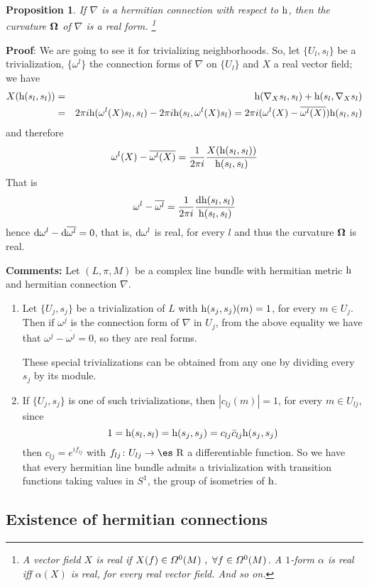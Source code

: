 \documentclass[12pt]{article}
\theoremstyle{plain}
\newtheorem{prop}{Proposition}
\def\beann{\begin{eqnarray*}}
\def\eeann{\end{eqnarray*}}
\def\qed{\ifvmode\removelastskip\fi
{\unskip\nobreak\hfil\penalty50\hbox{}\nobreak\hfil
\hbox{\vrule height1.2ex width1.2ex}\parfillskip=0pt
\finalhyphendemerits=0 \par\smallskip}}
\def\d{{\rm d}}
\def\h{{\rm h}}
\def\curv{{\bf \Omega}}
\def\Real{\mbox{\es R}}
\begin{document}
\begin{prop}
If $\nabla$ is a hermitian connection with respect to $\h$,
then the curvature $\curv $ of $\nabla$ is a real form.%
\footnote{A vector field $X$ is {\it real} if $X(f) \in {\mit\Omega}^0(M) \ ,
\ \forall f \in {\mit\Omega}^0(M)$. A $1$-form $\alpha$ is real iff
$\alpha (X)$ is real, for every real vector field. And so on.
}
\label{cureal}
\end{prop}
{\bf Proof}:  We are going to see it for trivializing
neighborhoods. So, let $\{ U_l,s_l \}$ be a trivialization, $\{
\omega^l  \}$ the connection forms of $\nabla$ on $\{ U_l \}$ and
$X$ a real vector field; we have \beann X(\h (s_l,s_l)) &=& \h
(\nabla_X s_l,s_l) + \h (s_l,\nabla_X s_l)
\\ &=&
2\pi i \h (\omega^l (X)s_l,s_l) - 2\pi i \h (s_l,\omega^l (X)s_l) =
2\pi i (\omega^l (X) - \overline{\omega^l (X)}) \h (s_l,s_l)
\eeann
and therefore
$$
\omega^l (X) - \overline{\omega^l (X)} =
\frac{1}{2\pi i} \frac{X(\h (s_l,s_l))}{\h (s_l,s_l)}
$$
That is
$$
\omega^l  - \overline{\omega^l } =
\frac{1}{2\pi i} \frac{\d \h (s_l,s_l)}{\h (s_l,s_l)}
$$
hence $\d\omega^l  - \d\overline{\omega^l } =0$,
that is, $\d\omega^l $ is real,
for every $l$ and thus the curvature $\curv$ is real.
\qed
%
{\bf Comments:}
Let $(L,\pi ,M)$ be a complex line bundle
with hermitian metric $\h$ and hermitian connection $\nabla$.
\begin{enumerate}
\item
Let $\{ U_j,s_j \}$ be a trivialization of $L$ with
$\h (s_j,s_j)(m) = 1$, for every $m \in U_j$.
Then if $\omega^j$ is the connection form of $\nabla$ in $U_j$,
from the above equality we have that
$\omega^j - \overline{\omega^j} = 0$,
so they are real forms.

These special trivializations can be obtained from any one
by dividing every $s_j$ by its module.
\item
If $\{ U_j,s_j \}$ is one of such trivializations,
then $|c_{l j}(m)|=1$, for every $m \in U_{l j}$, since
$$
1 = \h (s_l,s_l) = \h (s_j,s_j) = c_{l j} \bar c_{l j} \h (s_j,s_j)
$$
then $c_{l j} = e^{if_{l j}}$ with $f_{l j} \colon U_{l j} \to \Real$
a differentiable function. So we have that every hermitian line bundle
admits a trivialization with transition functions
taking values in $S^1$, the group of isometries of $\h$.
\end{enumerate}



\subsection{Existence of hermitian connections}
\end{document}
